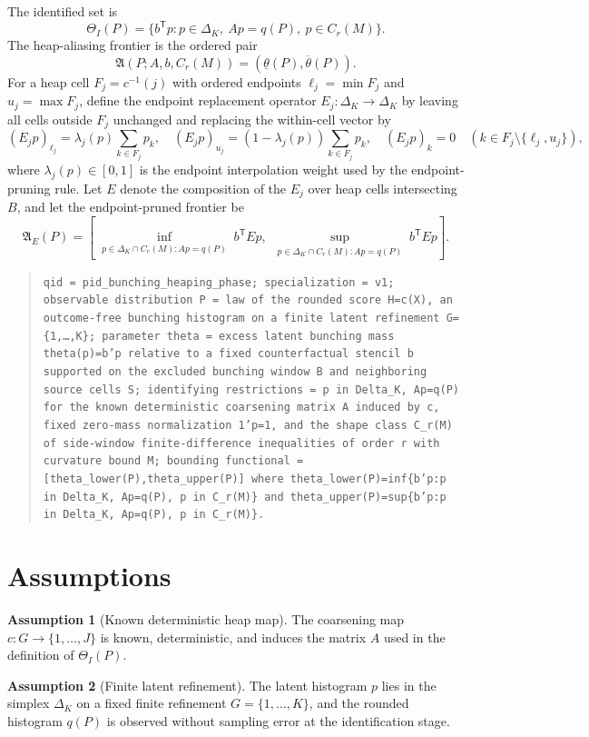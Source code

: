 \documentclass[11pt]{article}
\newcommand{\transpose}{\mathsf{T}}
\theoremstyle{definition}
\newtheorem{assumption}{Assumption}
\theoremstyle{plain}
\theoremstyle{remark}
\begin{document}
The identified set is
\[
  \Theta_I(P)=\{b^\transpose p:p\in\Delta_K,\ Ap=q(P),\ p\in C_r(M)\}.
\]
The heap-aliasing frontier is the ordered pair
\[
  \mathfrak A(P;A,b,C_r(M))=(\underline\theta(P),\overline\theta(P)).
\]
For a heap cell $F_j=c^{-1}(j)$ with ordered endpoints $\ell_j=\min F_j$ and $u_j=\max F_j$, define the endpoint replacement operator $E_j:\Delta_K\to\Delta_K$ by leaving all cells outside $F_j$ unchanged and replacing the within-cell vector by
\[
  (E_jp)_{\ell_j}=\lambda_j(p)\sum_{k\in F_j}p_k,\quad
  (E_jp)_{u_j}=(1-\lambda_j(p))\sum_{k\in F_j}p_k,\quad
  (E_jp)_k=0\quad(k\in F_j\setminus\{\ell_j,u_j\}),
\]
where $\lambda_j(p)\in[0,1]$ is the endpoint interpolation weight used by the endpoint-pruning rule. Let $E$ denote the composition of the $E_j$ over heap cells intersecting $B$, and let the endpoint-pruned frontier be
\[
  \mathfrak A_E(P)=
  \left[
  \inf_{\substack{p\in\Delta_K\cap C_r(M):Ap=q(P)}} b^\transpose Ep,\ 
  \sup_{\substack{p\in\Delta_K\cap C_r(M):Ap=q(P)}} b^\transpose Ep
  \right].
\]
\begin{quote}
\texttt{qid = pid\_bunching\_heaping\_phase; specialization = v1; observable distribution P = law of the rounded score H=c(X), an outcome-free bunching histogram on a finite latent refinement G=\{1,\ldots,K\}; parameter theta = excess latent bunching mass theta(p)=b'\!p relative to a fixed counterfactual stencil b supported on the excluded bunching window B and neighboring source cells S; identifying restrictions = p in Delta\_K, Ap=q(P) for the known deterministic coarsening matrix A induced by c, fixed zero-mass normalization 1'\!p=1, and the shape class C\_r(M) of side-window finite-difference inequalities of order r with curvature bound M; bounding functional = [theta\_lower(P),theta\_upper(P)] where theta\_lower(P)=inf\{b'\!p:p in Delta\_K, Ap=q(P), p in C\_r(M)\} and theta\_upper(P)=sup\{b'\!p:p in Delta\_K, Ap=q(P), p in C\_r(M)\}.}
\end{quote}

\section{Assumptions}
\begin{assumption}[Known deterministic heap map]\label{ass:heap}
The coarsening map $c:G\to\{1,\ldots,J\}$ is known, deterministic, and induces the matrix $A$ used in the definition of $\Theta_I(P)$.
\end{assumption}

\begin{assumption}[Finite latent refinement]\label{ass:finite}
The latent histogram $p$ lies in the simplex $\Delta_K$ on a fixed finite refinement $G=\{1,\ldots,K\}$, and the rounded histogram $q(P)$ is observed without sampling error at the identification stage.
\end{assumption}
\end{document}
